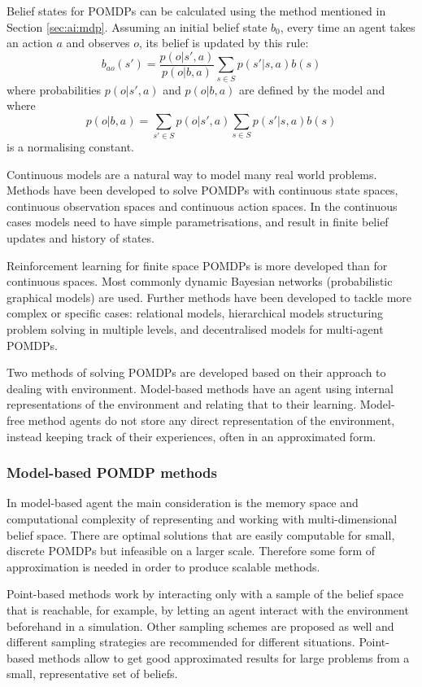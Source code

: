 Belief states for POMDPs can be calculated using the method mentioned in
Section \ref{sec:ai:mdp}. Assuming an initial belief state \(b_0\), every time
an agent takes an action \(a\) and observes \(o\), its belief is updated by
this rule: \[ b_{ao}(s') = \frac{ p(o|s',a) }{ p(o|b,a) } \sum_{s \in S}
p(s'|s,a) b(s) \] where probabilities \(p(o|s',a)\) and \(p(o|b,a)\) are
defined by the model and where \[p(o|b,a) = \sum_{s' \in S} p(o|s',a) \sum_{s
\in S} p(s'|s,a) b(s) \] is a normalising constant.
\parencite{Spaan2012ai+pomdp}

Continuous models are a natural way to model many real world problems. Methods
have been developed to solve POMDPs with continuous state spaces, continuous
observation spaces and continuous action spaces. In the continuous cases models
need to have simple parametrisations, and result in finite belief updates and
history of states. \parencite{Spaan2012ai+pomdp}

Reinforcement learning for finite space POMDPs is more developed than for
continuous spaces. Most commonly dynamic Bayesian networks (probabilistic
graphical models) are used. Further methods have been developed to tackle more
complex or specific cases: relational models, hierarchical models structuring
problem solving in multiple levels, and decentralised models for multi-agent
POMDPs. \parencite{Spaan2012ai+pomdp}

Two methods of solving POMDPs are developed based on their approach to dealing
with environment. Model-based methods have an agent using internal
representations of the environment and relating that to their learning. Model-
free method agents do not store any direct representation of the environment,
instead keeping track of their experiences, often in an approximated form.

\subsubsection{Model-based POMDP methods}
\label{sec:ai:pomdp:model:based}

In model-based agent the main consideration is the memory space and
computational complexity of representing and working with multi-dimensional
belief space. There are optimal solutions that are easily computable for small,
discrete POMDPs but infeasible on a larger scale. Therefore some form of
approximation is needed in order to produce scalable methods.
\parencite{Spaan2012ai+pomdp}

Point-based methods work by interacting only with a sample of the belief space
that is reachable, for example, by letting an agent interact with the
environment beforehand in a simulation. Other sampling schemes are proposed as
well and different sampling strategies are recommended for different
situations. Point-based methods allow to get good approximated results for
large problems from a small, representative set of beliefs.
\parencite{Spaan2012ai+pomdp}

